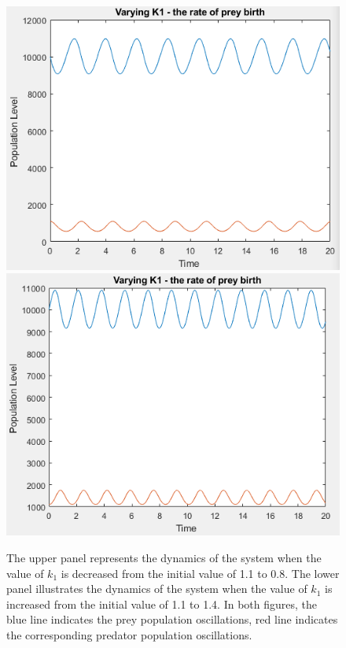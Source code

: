 \documentclass{article}
\begin{document}
\begin{figure}[H]
    \includegraphics[scale = 0.81]{k1_low.PNG}
    \includegraphics[scale = 0.8]{k1_high.PNG}
    \caption{The upper panel represents the dynamics of the system when the value of $k_1$ is decreased from the initial value of 1.1 to 0.8. The lower panel illustrates the dynamics of the system when the value of $k_1$ is increased from the initial value of 1.1 to 1.4. In both figures, the blue line indicates the prey population oscillations, red line indicates the corresponding predator population oscillations.}
    \label{fig:k1_vals}
\end{figure}
\end{document}
